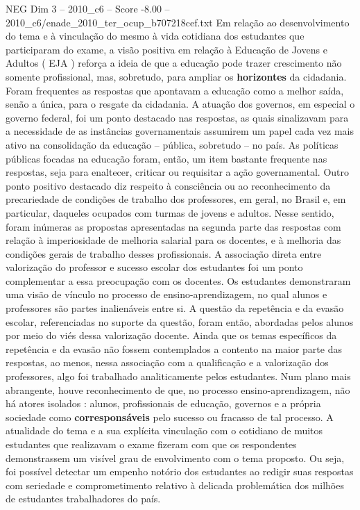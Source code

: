 \begin{textsample}{NEG Dim 3 – 2010\_c6 – Score -8.00 – 2010\_c6/enade\_2010\_ter\_ocup\_b707218cef.txt}
Em relação ao desenvolvimento do tema e à vinculação do mesmo à vida cotidiana dos estudantes que participaram do exame, a visão positiva em relação à Educação de Jovens e Adultos ( EJA ) reforça a ideia de que a educação pode trazer crescimento não somente profissional, mas, sobretudo, para ampliar os \textbf{horizontes} da cidadania.
Foram frequentes as respostas que apontavam a educação como a melhor saída, senão a única, para o resgate da cidadania.
A atuação dos governos, em especial o governo federal, foi um ponto destacado nas respostas, as quais sinalizavam para a necessidade de as instâncias governamentais assumirem um papel cada vez mais ativo na consolidação da educação – pública, sobretudo – no país.
As políticas públicas focadas na educação foram, então, um item bastante frequente nas respostas, seja para enaltecer, criticar ou requisitar a ação governamental.
Outro ponto positivo destacado diz respeito à consciência ou ao reconhecimento da precariedade de condições de trabalho dos professores, em geral, no Brasil e, em particular, daqueles ocupados com turmas de jovens e adultos.
Nesse sentido, foram inúmeras as propostas apresentadas na segunda parte das respostas com relação à imperiosidade de melhoria salarial para os docentes, e à melhoria das condições gerais de trabalho desses profissionais.
A associação direta entre valorização do professor e sucesso escolar dos estudantes foi um ponto complementar a essa preocupação com os docentes.
Os estudantes demonstraram uma visão de vínculo no processo de ensino-aprendizagem, no qual alunos e professores são partes inalienáveis entre si.
A questão da repetência e da evasão escolar, referenciadas no suporte da questão, foram então, abordadas pelos alunos por meio do viés dessa valorização docente.
Ainda que os temas específicos da repetência e da evasão não fossem contemplados a contento na maior parte das respostas, ao menos, nessa associação com a qualificação e a valorização dos professores, algo foi trabalhado analiticamente pelos estudantes.
Num plano mais abrangente, houve reconhecimento de que, no processo ensino-aprendizagem, não há atores isolados : alunos, profissionais de educação, governos e a própria sociedade como \textbf{corresponsáveis} pelo sucesso ou fracasso de tal processo.
A atualidade do tema e a sua explícita vinculação com o cotidiano de muitos estudantes que realizavam o exame fizeram com que os respondentes demonstrassem um visível grau de envolvimento com o tema proposto.
Ou seja, foi possível detectar um empenho notório dos estudantes ao redigir suas respostas com seriedade e comprometimento relativo à delicada problemática dos milhões de estudantes trabalhadores do país.

\end{textsample}

